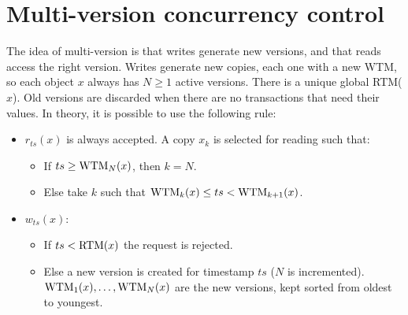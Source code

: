 \documentclass[12pt, a4paper]{report}
\newtheorem[style=M,bodystyle=\normalfont]{theorem}{Theorem}
\newtheorem[style=M,bodystyle=\normalfont]{corollary}{Corollary}
\newtheorem[style=M,bodystyle=\normalfont]{lemma}{Lemma}
\newtheorem[style=M,bodystyle=\normalfont]{definition}{Definition}
\begin{document}
    \section{Multi-version concurrency control}
    The idea of multi-version is that writes generate new versions, and that reads access the right version. Writes generate new copies, each one with a new WTM, so each object $x$ 
    always has $N \geq 1$ active versions. There is a unique global RTM($x$). Old versions are discarded when there are no transactions that need their values. 
    In theory, it is possible to use the following rule: 
    \begin{itemize}
        \item $r_{ts}(x)$ is always accepted. A copy $x_k$ is selected for reading such that:
            \begin{itemize}
                \item If $ts \geq \textnormal{WTM}_N(x)$, then $k=N$.
                \item Else take $k$ such that $\textnormal{WTM}_k(x) \leq ts < \textnormal{WTM}_{k+1}(x)$. 
            \end{itemize}
        \item $w_{ts}(x)$: 
            \begin{itemize}
                \item If $ts < \textnormal{RTM}(x)$ the request is rejected. 
                \item Else a new version is created for timestamp $ts$ ($N$ is incremented). $\textnormal{WTM}_1(x), \dots, \textnormal{WTM}_N(x)$ are the new versions, kept sorted from oldest to youngest.
            \end{itemize}
    \end{itemize}
\end{document}
